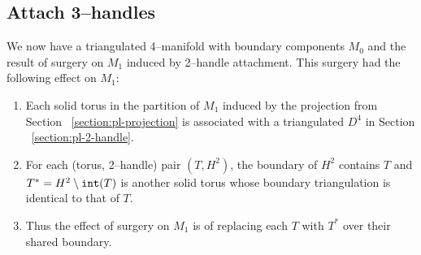 %	


\subsection{Attach 3--handles}

We now have a triangulated 4--manifold with boundary components $M_0$ and the result of surgery on $M_1$ induced by 2--handle attachment.
This surgery had the following effect on $M_1$:
\begin{enumerate}
	\item Each solid torus in the partition of $M_1$ induced by the projection from Section ~\ref{section:pl-projection} is associated with a triangulated $D^4$ in Section ~\ref{section:pl-2-handle}.
	\item For each (torus, 2--handle) pair $(T, H^2)$, the boundary of $H^2$ contains $T$ and $T^* = H^2\setminus \texttt{int}(T)$ is another solid torus whose boundary triangulation is identical to that of $T$.
	\item Thus the effect of surgery on $M_1$ is of replacing each $T$ with $T^*$ over their shared boundary.
\end{enumerate}

